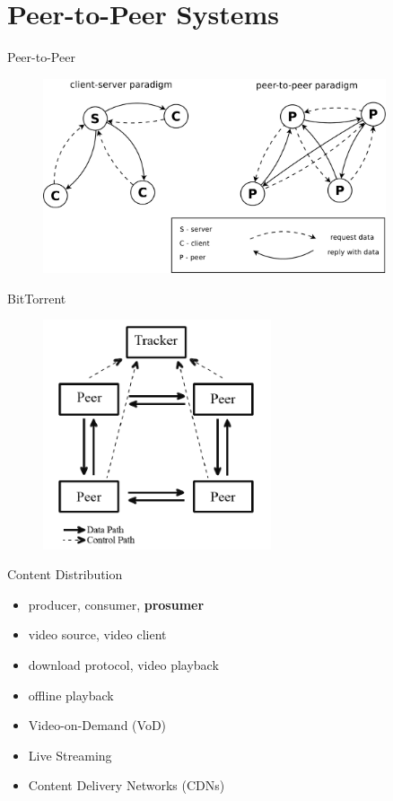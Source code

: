 \documentclass{beamer}
\begin{document}
\section{Peer-to-Peer Systems}

\begin{frame}{Peer-to-Peer}
  \begin{figure}
    \includegraphics[width=0.9\textwidth]{img/client-server-vs-p2p}
  \end{figure}
\end{frame}

\begin{frame}{BitTorrent}
  \begin{figure}
    \includegraphics[width=0.6\textwidth]{img/bittorrent-overview}
  \end{figure}
\end{frame}

\begin{frame}{Content Distribution}
  \begin{itemize}
    \item producer, consumer, \textbf{prosumer}
    \item video source, video client
    \item download protocol, video playback
    \item offline playback
    \item Video-on-Demand (VoD)
    \item Live Streaming
    \item Content Delivery Networks (CDNs)
  \end{itemize}
\end{frame}
\end{document}
